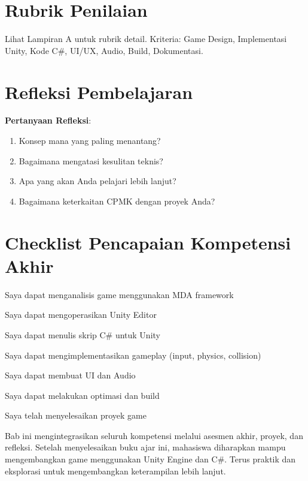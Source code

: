\documentclass[../main]{subfiles}
\begin{document}
\section{Rubrik Penilaian}

Lihat Lampiran A untuk rubrik detail. Kriteria: Game Design, Implementasi Unity, Kode C\#, UI/UX, Audio, Build, Dokumentasi.

\section{Refleksi Pembelajaran}

\textbf{Pertanyaan Refleksi}:
\begin{enumerate}
\item Konsep mana yang paling menantang?
\item Bagaimana mengatasi kesulitan teknis?
\item Apa yang akan Anda pelajari lebih lanjut?
\item Bagaimana keterkaitan CPMK dengan proyek Anda?
\end{enumerate}

\section{Checklist Pencapaian Kompetensi Akhir}

\begin{checklist}
  \item Saya dapat menganalisis game menggunakan MDA framework
  \item Saya dapat mengoperasikan Unity Editor
  \item Saya dapat menulis skrip C\# untuk Unity
  \item Saya dapat mengimplementasikan gameplay (input, physics, collision)
  \item Saya dapat membuat UI dan Audio
  \item Saya dapat melakukan optimasi dan build
  \item Saya telah menyelesaikan proyek game
\end{checklist}

\begin{rangkuman}
Bab ini mengintegrasikan seluruh kompetensi melalui asesmen akhir, proyek, dan refleksi. Setelah menyelesaikan buku ajar ini, mahasiswa diharapkan mampu mengembangkan game menggunakan Unity Engine dan C\#. Terus praktik dan eksplorasi untuk mengembangkan keterampilan lebih lanjut.
\end{rangkuman}

\ifSubfilesClassLoaded{
  \renewcommand{\bibname}{Daftar Pustaka}
  
  
}{}
\end{document}
